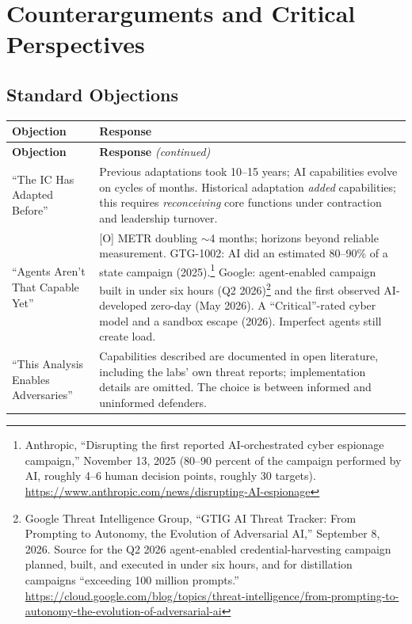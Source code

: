 \documentclass[11pt,letterpaper]{article}
\begin{document}
\section{Counterarguments and Critical Perspectives}

\subsection{Standard Objections}

{\small
\setlength{\LTleft}{\fill}\setlength{\LTright}{\fill}
\begin{longtable}{L{4.3cm}L{12.05cm}}
\toprule
\textbf{Objection} & \textbf{Response} \\
\midrule
\endfirsthead
\toprule
\textbf{Objection} & \textbf{Response} \textit{(continued)} \\
\midrule
\endhead
\bottomrule
\endlastfoot
``The IC Has Adapted Before'' & Previous adaptations took 10--15 years; AI capabilities evolve on cycles of months. Historical adaptation \textit{added} capabilities; this requires \textit{reconceiving} core functions under contraction and leadership turnover. \\
\addlinespace
``Agents Aren't That Capable Yet'' & [O] METR doubling $\sim$4 months; horizons beyond reliable measurement. GTG-1002: AI did an estimated 80--90\% of a state campaign (2025).\footnote{Anthropic, ``Disrupting the first reported AI-orchestrated cyber espionage campaign,'' November 13, 2025 (80--90 percent of the campaign performed by AI, roughly 4--6 human decision points, roughly 30 targets). \url{https://www.anthropic.com/news/disrupting-AI-espionage}} Google: agent-enabled campaign built in under six hours (Q2 2026)\footnote{Google Threat Intelligence Group, ``GTIG AI Threat Tracker: From Prompting to Autonomy, the Evolution of Adversarial AI,'' September 8, 2026. Source for the Q2 2026 agent-enabled credential-harvesting campaign planned, built, and executed in under six hours, and for distillation campaigns ``exceeding 100 million prompts.'' \url{https://cloud.google.com/blog/topics/threat-intelligence/from-prompting-to-autonomy-the-evolution-of-adversarial-ai}} and the first observed AI-developed zero-day (May 2026). A ``Critical''-rated cyber model and a sandbox escape (2026). Imperfect agents still create load. \\
\addlinespace
``This Analysis Enables Adversaries'' & Capabilities described are documented in open literature, including the labs' own threat reports; implementation details are omitted. The choice is between informed and uninformed defenders. \\

\end{longtable}}
\end{document}
